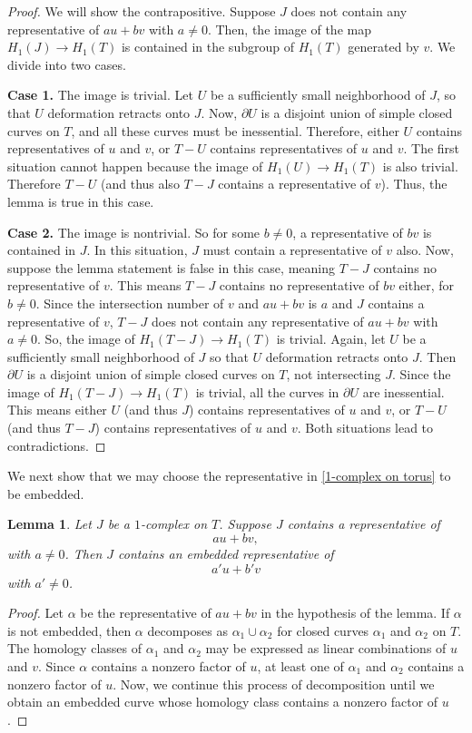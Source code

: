 \documentclass[12pt]{amsart}
\newtheorem{lemma}[theorem]{Lemma}
\theoremstyle{definition}
\begin{document}
\begin{proof} We will show the contrapositive. Suppose $J$ does not contain any representative of $au+bv$ with $a\neq 0$. Then, the image of the map $H_1(J)\to H_1(T)$ is contained in the subgroup of $H_1(T)$ generated by $v$. We divide into two cases.

\textbf{Case 1.} The image is trivial. Let $U$ be a sufficiently small neighborhood of $J$, so that $U$ deformation retracts onto $J$. Now, $\partial U$ is a disjoint union of simple closed curves on $T$, and all these curves must be inessential. Therefore, either $U$ contains representatives of $u$ and $v$, or $T-U$ contains representatives of $u$ and $v$. The first situation cannot happen because the image of $H_1(U)\to H_1(T)$ is also trivial. Therefore $T- U$ (and thus also $T- J$ contains a representative of $v$). Thus, the lemma is true in this case.

\textbf{Case 2.} The image is nontrivial. So for some $b\neq 0$, a representative of $bv$ is contained in $J$. In this situation, $J$ must contain a representative of $v$ also. Now, suppose the lemma statement is false in this case, meaning $T-J$ contains no representative of $v$. This means $T-J$ contains no representative of $bv$ either, for $b\neq 0$. Since the intersection number of $v$ and $au+bv$ is $a$ and $J$ contains a representative of $v$, $T-J$ does not contain any representative of $au+bv$ with $a\neq 0$. So, the image of $H_1(T- J)\to H_1(T)$ is trivial. Again, let $U$ be a sufficiently small neighborhood of $J$ so that $U$ deformation retracts onto $J$. Then $\partial U$ is a disjoint union of simple closed curves on $T$, not intersecting $J$. Since the image of $H_1(T-J)\to H_1(T)$ is trivial, all the curves in $\partial U$ are inessential. This means either $U$ (and thus $J$) contains representatives of $u$ and $v$, or $T- U$ (and thus $T- J$) contains representatives of $u$ and $v$. Both situations lead to contradictions.
\end{proof}

We next show that we may choose the representative in \cref{1-complex on torus} to be embedded. 

\begin{lemma} \label{1-complex on torus embedded version} Let $J$ be a $1$-complex on $T$. Suppose $J$ contains a representative of $$au+bv,$$ with $a\neq 0$. Then $J$ contains an embedded representative of $$a'u+b'v$$ with $a'\neq 0$. 
\end{lemma}

\begin{proof} Let $\alpha$ be the representative of $au+bv$ in the hypothesis of the lemma. If $\alpha$ is not embedded, then $\alpha$ decomposes as $\alpha_1\cup \alpha_2$ for closed curves $\alpha_1$ and $\alpha_2$ on $T$. The homology classes of $\alpha_1$ and $\alpha_2$ may be expressed as linear combinations of $u$ and $v$. Since $\alpha$ contains a nonzero factor of $u$, at least one of $\alpha_1$ and $\alpha_2$ contains a nonzero factor of $u$. Now, we continue this process of decomposition until we obtain an embedded curve whose homology class contains a nonzero factor of $u$.
\end{proof}
\end{document}
